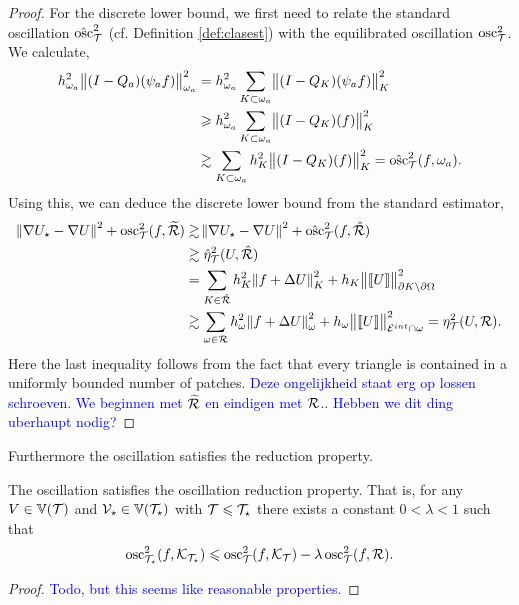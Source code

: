 \documentclass[thesis.tex]{subfiles}
\begin{document}
\begin{proof}
  For the discrete lower bound, we first need to relate the standard oscillation $\hat{\operatorname{osc}}_{\mathcal{T}}^2$ (cf. Definition \ref{def:clasest})
  with the equilibrated oscillation $\operatorname{osc}_{\mathcal{T}}^2$. We calculate,
  \begin{align*}
    h_{\omega_a}^2 \norm{(I-Q_a)(\psi_af)}^2_{\omega_a} &= h_{\omega_a}^2 \sum_{K \subset \omega_a} \norm{(I-Q_K)(\psi_a f)}^2_K \\
     &\geqslant h^2_{\omega_a} \sum_{K \subset \omega_a} \norm{(I-Q_K)(f)}^2_K \\
    &\gtrsim \sum_{K \subset \omega_a} h_K^2 \norm{(I-Q_K)(f)}^2_K = \hat{\operatorname{osc}}_{\mathcal{T}}^2(f, \omega_a).
  \end{align*}
  Using this, we can deduce the discrete lower bound from the standard estimator,
  \begin{align*}
    \norm{\nabla U_\star - \nabla U}^2 + \operatorname{osc}_{\mathcal{T}}^2(f, \widetilde {\mathcal{R}}) &\gtrsim \norm{\nabla U_\star - \nabla U}^2 + \hat{\operatorname{osc}}_{\mathcal{T}}^2(f, \hat {\mathcal{R}}) \\
    &\gtrsim \hat \eta^2_{\mathcal{T}}(U, \hat {\mathcal{R}}) \\
    &= \sum_{K \in \hat {\mathcal{R}}} h_K^2\norm{f + \Delta U}_K^2 + h_K\norm{\llbracket U  \rrbracket}^2_{\partial K \setminus \partial \Omega}\\
    &\gtrsim \sum_{\omega \in \mathcal{R}} h_\omega^2\norm{f + \Delta U}_\omega^2 + h_\omega \norm{\llbracket U  \rrbracket}^2_{\mathcal{E}^{int} \cap \omega}= \eta_{\mathcal{T}}^2(U, \mathcal{R}).
  \end{align*}
  Here the last inequality follows from the fact that every triangle is contained in a uniformly bounded number of patches.
  \textcolor{blue}{Deze ongelijkheid staat erg op lossen schroeven. We beginnen met $\widetilde {\mathcal{R}}$ en eindigen met $\mathcal{R}$.. Hebben
  we dit ding uberhaupt nodig?}
\end{proof}
Furthermore the oscillation satisfies the reduction property.
\begin{lem}
  \label{lem:oscasum}
  The oscillation satisfies the oscillation reduction property. That is, for any $V \in \mathbb{V}(\mathcal{T})$ and $\mathcal{V}_\star \in \mathbb{V}(\mathcal{T}_\star)$ with $\mathcal{T} \leqslant \mathcal{T}_\star$  there exists a constant $0 < \lambda < 1$ such that
  \[
  \operatorname{osc}_{\mathcal{T}_\star}^2(f, \mathcal{K}_{\mathcal{T}_\star}) \leqslant \operatorname{osc}^2_{\mathcal{T}}(f, \mathcal{K}_{\mathcal{T}}) - \lambda \operatorname{osc}^2_{\mathcal{T}}(f, \mathcal{R}).
  \]
\end{lem}
\begin{proof}
  \textcolor{blue}{Todo, but this seems like reasonable properties.}
\end{proof}
\end{document}

